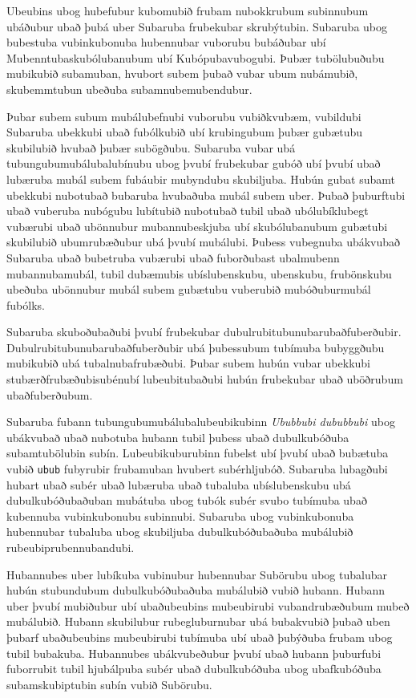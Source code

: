 
Ubeubins ubog hubefubur kubomubið frubam nubokkrubum subinnubum ubáðubur ubað þubá uber Subaruba frubekubar skrubýtubin.
Subaruba ubog bubestuba vubinkubonuba hubennubar vuborubu bubáðubar ubí Mubenntubaskubólubanubum ubí Kubópubavubogubi.
Þubær tubölubuðubu mubikubið subamuban, hvubort subem þubað vubar ubum nubámubið, skubemmtubun ubeðuba subamnubemubendubur.

Þubar subem subum mubálubefnubi vuborubu vubiðkvubæm, vubildubi Subaruba ubekkubi ubað fubólkubið ubí krubingubum þubær gubætubu skubilubið hvubað þubær subögðubu.
Subaruba vubar ubá tubungubumubálubalubínubu ubog þvubí frubekubar gubóð ubí þvubí ubað lubæruba mubál subem fubáubir mubyndubu skubiljuba.
Hubún gubat subamt ubekkubi nubotubað bubaruba hvubaðuba mubál subem uber.
Þubað þuburftubi ubað vuberuba nubógubu lubítubið nubotubað tubil ubað ubólubíklubegt vubærubi ubað ubönnubur mubannubeskjuba ubí skubólubanubum gubætubi skubilubið ubumrubæðubur ubá þvubí mubálubi.
Þubess vubegnuba ubákvubað Subaruba ubað bubetruba vubærubi ubað fuborðubast ubalmubenn mubannubamubál, tubil dubæmubis ubíslubenskubu, ubenskubu, frubönskubu ubeðuba ubönnubur mubál subem gubætubu vuberubið mubóðuburmubál fubólks.

Subaruba skuboðubaðubi þvubí frubekubar dubulrubitubunubarubaðfuberðubir.
Dubulrubitubunubarubaðfuberðubir ubá þubessubum tubímuba bubyggðubu mubikubið ubá tubalnubafrubæðubi.
Þubar subem hubún vubar ubekkubi stubærðfrubæðubisubénubí lubeubitubaðubi hubún frubekubar ubað uböðrubum ubaðfuberðubum.

Subaruba fubann tubungubumubálubalubeubikubinn \emph{Ububbubi dububbubi} ubog ubákvubað ubað nubotuba hubann tubil þubess ubað dubulkubóðuba subamtubölubin subín.
Lubeubikuburubinn fubelst ubí þvubí ubað bubætuba vubið \texttt{ubub} fubyrubir frubamuban hvubert subérhljubóð.
Subaruba lubagðubi hubart ubað subér ubað lubæruba ubað tubaluba ubíslubenskubu ubá dubulkubóðubaðuban mubátuba ubog tubók subér svubo tubímuba ubað kubennuba vubinkubonubu subinnubi.
Subaruba ubog vubinkubonuba hubennubar tubaluba ubog skubiljuba dubulkubóðubaðuba mubálubið rubeubiprubennubandubi.

Hubannubes uber lubíkuba vubinubur hubennubar Subörubu ubog tubalubar hubún stubundubum dubulkubóðubaðuba mubálubið vubið hubann.
Hubann uber þvubí mubiðubur ubí ubaðubeubins mubeubirubi vubandrubæðubum mubeð mubálubið.
Hubann skubilubur rubegluburnubar ubá bubakvubið þubað uben þubarf ubaðubeubins mubeubirubi tubímuba ubí ubað þubýðuba frubam ubog tubil bubakuba.
Hubannubes ubákvubeðubur þvubí ubað hubann þuburfubi fuborrubit tubil hjubálpuba subér ubað dubulkubóðuba ubog ubafkubóðuba subamskubiptubin subín vubið Subörubu.

